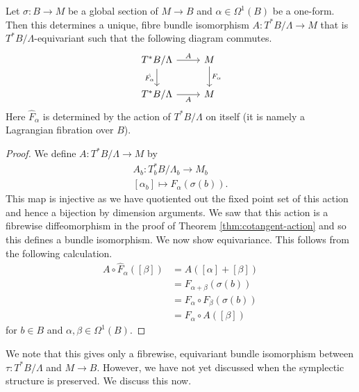 \begin{lemma}\label{lemma:identification-of-bundle}
    Let $\sigma: B \to M$ be a global section of $M \to B$ and $\alpha \in \Omega^1(B)$ be a one-form. Then this determines a unique, fibre bundle isomorphism
    $A: T^*B/\Lambda \to M$ that is $T^*B/\Lambda$-equivariant such that the following diagram commutes.
    \[
        \begin{tikzcd}
            T^*B/\Lambda \arrow[r,"A"] \arrow[d,"\hat{F_{\alpha}}"'] & M \arrow[d,"F_{\alpha}"] \\
            T^*B/\Lambda \arrow[r,"A"'] & M
        \end{tikzcd}
    \]
    Here $\hat{F}_{\alpha}$ is determined by the action of $T^*B/\Lambda$ on itself
    (it is namely a Lagrangian fibration over $B$).
\end{lemma}
\begin{proof}
    We define $A: T^*B/\Lambda \to M$ by
    \begin{align*}
        A_b: T_b^*B/\Lambda_b \to M_b \\
        [\alpha_b] \mapsto F_{\alpha}(\sigma(b)).
    \end{align*}
    This map is injective as we have quotiented out the fixed point set of this action and hence a bijection by dimension arguments. We saw that this action is a fibrewise diffeomorphism in the
    proof of Theorem \ref{thm:cotangent-action} and so this defines a bundle isomorphism. We now show equivariance. This follows from the following calculation.
    \begin{align*}
        A \circ \hat{F}_{\alpha}([\beta]) & = A([\alpha] + [\beta])                \\
                                          & =F_{\alpha + \beta}(\sigma(b))         \\
                                          & = F_{\alpha}\circ F_{\beta}(\sigma(b)) \\
                                          & = F_{\alpha}\circ A ([\beta])
    \end{align*}
    for $b \in B$ and $\alpha, \beta \in \Omega^1(B)$.
\end{proof}

We note that this gives only a fibrewise, equivariant bundle isomorphism
between $\tau : T^*B/\Lambda$ and $M \to B$. However, we have not yet discussed
when the symplectic structure is preserved. We discuss this now.

